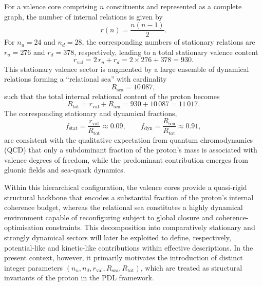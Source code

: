 \documentclass[11pt,a4paper]{article}
\begin{document}
For a valence core comprising \(n\) constituents and represented as a complete graph, the number of internal relations is given by
\[
r(n) = \frac{n(n-1)}{2}.
\]
For \(n_u = 24\) and \(n_d = 28\), the corresponding numbers of stationary relations are \(r_u = 276\) and \(r_d = 378\), respectively, leading to a total stationary valence content
\begin{equation}
r_{\mathrm{val}} = 2\,r_u + r_d = 2 \times 276 + 378 = 930.
\end{equation}
This stationary valence sector is augmented by a large ensemble of dynamical relations forming a “relational sea” with cardinality
\begin{equation}
R_{\mathrm{sea}} = 10\,087,
\end{equation}
such that the total internal relational content of the proton becomes
\begin{equation}
R_{\mathrm{tot}} = r_{\mathrm{val}} + R_{\mathrm{sea}} = 930 + 10\,087 = 11\,017.
\end{equation}
The corresponding stationary and dynamical fractions,
\begin{equation}
f_{\mathrm{stat}} = \frac{r_{\mathrm{val}}}{R_{\mathrm{tot}}} \approx 0.09, 
\qquad 
f_{\mathrm{dyn}} = \frac{R_{\mathrm{sea}}}{R_{\mathrm{tot}}} \approx 0.91,
\end{equation}
are consistent with the qualitative expectation from quantum chromodynamics (QCD) that only a subdominant fraction of the proton’s mass is associated with valence degrees of freedom, while the predominant contribution emerges from gluonic fields and sea-quark dynamics.\cite{AmslerQCDProton,LaubscherIMRadPDL2026}

Within this hierarchical configuration, the valence cores provide a quasi-rigid structural backbone that encodes a substantial fraction of the proton’s internal coherence budget, whereas the relational sea constitutes a highly dynamical environment capable of reconfiguring subject to global closure and coherence-optimisation constraints.\cite{LaubscherPDLFull2026,LaubscherLDP2026} This decomposition into comparatively stationary and strongly dynamical sectors will later be exploited to define, respectively, potential-like and kinetic-like contributions within effective descriptions. In the present context, however, it primarily motivates the introduction of distinct integer parameters $(n_u,n_d,r_{\mathrm{val}},R_{\mathrm{sea}},R_{\mathrm{tot}})$, which are treated as structural invariants of the proton in the PDL framework.
\end{document}
